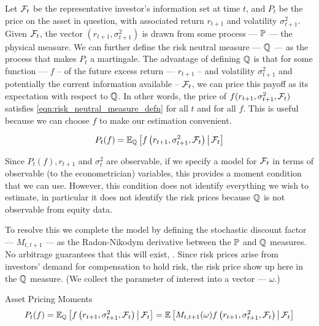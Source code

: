 \documentclass[11pt, letterpaper, twoside, final]{article}
\begin{document}
Let $\mathcal{F}_t$ be the representative investor's information set at time $t$, and $P_t$ be the price on the asset in
question, with associated return $r_{t+1}$ and volatility  $\sigma^2_{t+1}$.
Given $\mathcal{F}_{t}$, the vector $\left( r_{t+1},  \sigma^2_{t+1}\right)$ is drawn from some process --- $\mathbb{P}$ --- the
physical measure. 
We can further define the risk neutral measure --- $\mathbb{Q}$ ---  as the process that makes $P_t$ a martingale.
The advantage of defining $\mathbb{Q}$ is that for some function --- $f$ -- of the future excess return --- $r_{t+1}$  --
and volatility $\sigma^2_{t+1}$ and potentially the current information available -- $\mathcal{F}_t$, we can price this
payoff as its expectation with respect to $\mathbb{Q}$.
In other  words, the price of $f(r_{t+1}, \sigma^2_{t+1}, \mathcal{F}_t)$ satisfies \cref{eqn:risk_neutral_measure_defn}
for all $t$ and for all $f$.  
This is useful because we can choose $f$ to make our estimation convenient.

\begin{equation}
    P_t(f) = \operatorname{\mathbb{E}}_{\mathbb{Q}}\left[ f\left(r_{t+1}, \sigma^2_{t+1}, \mathcal{F}_{t}\right)  \,\middle\vert\, \mathcal{F}_{t}\right]
    \label{eqn:risk_neutral_measure_defn}
\end{equation}

Since $P_t(f), r_{t+1}$ and $\sigma_t^2$ are observable, if we specify a model for $\mathcal{F}_t$ in terms of observable
(to the econometrician) variables, this provides a moment condition that we can use. 
However, this condition does not identify everything we wish to estimate, in particular it does not identify the
risk prices because $\mathbb{Q}$ is not observable from equity data.

To resolve this we complete the model by defining the stochastic discount factor --- $M_{t, t+1}$ --- as the
Radon-Nikodym derivative between the $\mathbb{P}$ and $\mathbb{Q}$ measures. 
No arbitrage guarantees that this will exist, \parencite{harrison1978martingales}.
Since risk prices arise from investors' demand for compensation to hold risk, the risk price show up here 
in the $\mathbb{Q}$ measure. 
(We collect the parameter of interest into a vector --- $\omega$.)


\begin{defn}{Asset Pricing Moments}
    \begin{equation}
        P_t(f)  = \operatorname{\mathbb{E}}_{\mathbb{Q}} \left[f\left(r_{t+1}, \sigma^2_{t+1} , \mathcal{F}_t\right) \,\middle\vert\, \mathcal{F}_t \right] =
        \operatorname{\mathbb{E}}\left[M_{t,t+1}(\omega)f\left(r_{t+1}, \sigma^2_{t+1}, \mathcal{F}_t\right) \,\middle\vert\, \mathcal{F}_t \right] 
    \end{equation}
\end{defn}
\end{document}
